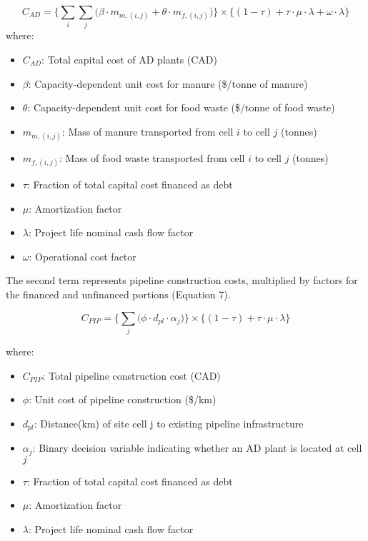 \documentclass[12pt]{article}
\begin{document}
\begin{equation}
  C_{AD} = \biggl\{\sum_{i}\sum_{j} \bigl( \beta \cdot m_{m, (i,j)} + \theta \cdot m_{f, (i,j)} \bigr)\biggr\} \times \{(1 - \tau) + \tau \cdot \mu \cdot \lambda + \omega \cdot \lambda\}
\end{equation}
where:
\begin{itemize}
  \item $C_{AD}$: Total capital cost of AD plants (CAD)
  \item $\beta$: Capacity-dependent unit cost for manure (\$/tonne of manure)
  \item $\theta$: Capacity-dependent unit cost for food waste (\$/tonne of food waste)
  \item $m_{m, (i,j)}$: Mass of manure transported from cell $i$ to cell $j$ (tonnes)
  \item $m_{f, (i,j)}$: Mass of food waste transported from cell $i$ to cell $j$ (tonnes)
  \item $\tau$: Fraction of total capital cost financed as debt
  \item $\mu$: Amortization factor
  \item $\lambda$: Project life nominal cash flow factor
  \item $\omega$: Operational cost factor
\end{itemize}

The second term represents pipeline construction costs, multiplied by factors for the financed and unfinanced portions (Equation 7).

\begin{equation}
  C_{PIP} = \biggl\{\sum_{j} \bigl( \phi \cdot d_{pl} \cdot \alpha_j \bigr)\biggr\} \times \{(1 - \tau) + \tau \cdot \mu \cdot \lambda\}
\end{equation}

where:
\begin{itemize}
  \item $C_{PIP}$: Total pipeline construction cost (CAD)
  \item $\phi$: Unit cost of pipeline construction (\$/km)
  \item $d_{pl}$: Distance(km) of site cell j to existing pipeline infrastructure
  \item $\alpha_j$: Binary decision variable indicating whether an AD plant is located at cell $j$
  \item $\tau$: Fraction of total capital cost financed as debt
  \item $\mu$: Amortization factor
  \item $\lambda$: Project life nominal cash flow factor
\end{itemize}
\end{document}
